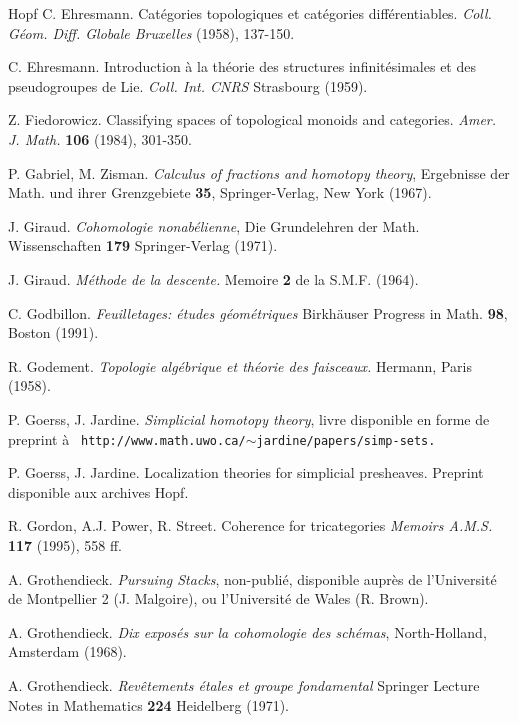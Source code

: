 \documentclass[12pt]{article}
\begin{document}
\begin{thebibliography}{Hopf}
C. Ehresmann. Cat\'egories topologiques et cat\'egories diff\'erentiables.
{\em Coll. G\'eom. Diff. Globale Bruxelles} (1958), 137-150.

C. Ehresmann. Introduction \`a la th\'eorie des structures
infinit\'esimales et des
pseudogroupes de Lie. {\em Coll. Int. CNRS} Strasbourg (1959).

Z. Fiedorowicz. Classifying spaces of topological monoids and categories.
{\em Amer. J. Math.} {\bf 106} (1984), 301-350.

P. Gabriel, M. Zisman. {\em Calculus of fractions and homotopy theory},
Ergebnisse der Math. und ihrer Grenzgebiete {\bf 35}, Springer-Verlag, New York
(1967).

J. Giraud. {\em Cohomologie nonab\'elienne}, Die Grundelehren der
Math. Wissen\-schaften {\bf 179} Springer-Verlag (1971).

J. Giraud. {\em M\'ethode de la descente.} Memoire {\bf 2} de la S.M.F.
(1964).

C. Godbillon. {\em Feuilletages: \'etudes g\'eom\'etriques}
Birkh\"auser Progress in Math. {\bf 98}, Boston (1991).

R. Godement. {\em Topologie alg\'ebrique et th\'eorie des faisceaux.}
Hermann, Paris (1958).

P. Goerss, J. Jardine. {\em Simplicial homotopy theory}, livre disponible
en forme de preprint \`a {\tt
http://www.math.uwo.ca/}$\sim${\tt jardine/papers/simp-sets.}

P. Goerss, J. Jardine. Localization theories for simplicial presheaves. Preprint
disponible aux archives Hopf.

R. Gordon, A.J. Power, R. Street.  Coherence for tricategories {\em  Memoirs
A.M.S.} {\bf 117} (1995), 558 ff.

A. Grothendieck.  {\em Pursuing Stacks}, non-publi\'e, disponible aupr\`es de
l'Universit\'e de Montpellier 2 (J. Malgoire), ou l'Universit\'e de Wales
(R. Brown).

A. Grothendieck.  {\em Dix expos\'es sur la cohomologie des sch\'emas},
North-Holland, Amsterdam (1968).

A. Grothendieck. {\em Rev\^etements \'etales et groupe fondamental}
Springer Lecture Notes in Mathematics {\bf 224} Heidelberg (1971).



\end{thebibliography}
\end{document}
